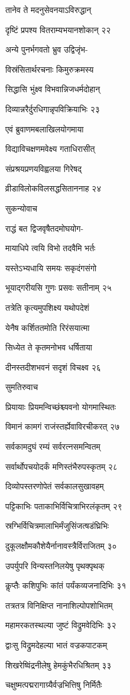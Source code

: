 तानेव ते मदनुसेवनयाऽविरुद्धान्

दृष्टिं प्रपश्य वितराम्यभयानशोकान् २२

अन्ये पुनर्भगवतो भ्रुव उद्विजृंभ-

विस्रंसितार्थरचनाः किमुरुक्रमस्य

सिद्धासि भुंक्ष्व विभवान्निजधर्मदोहान्

दिव्यान्नरैर्दुरधिगान्नृपविक्रियाभिः २३

एवं ब्रुवाणमबलाखिलयोगमाया

विद्याविचक्षणमवेक्ष्य गताधिरासीत्

संप्रश्रयप्रणयविह्वलया गिरेषद्

व्रीडाविलोकविलसद्धसिताननाह २४

सुकन्योवाच

राद्धं बत द्विजवृषैतदमोघयोग-

मायाधिपे त्वयि विभो तदवैमि भर्तः

यस्तेऽभ्यधायि समयः सकृदंगसंगो

भूयाद्गरीयसि गुणः प्रसवः सतीनाम् २५

तत्रेति कृत्यमुपशिक्ष्य यथोपदेशं

येनैष कर्शिततमोति रिरंसयात्मा

सिध्येत ते कृतमनोभव धर्षिताया

दीनस्तदीशभवनं सदृशं विचक्ष्व २६

सुमतिरुवाच

प्रियायाः प्रियमन्विच्छंश्च्यवनो योगमास्थितः

विमानं कामगं राजंस्तर्ह्येवाविरचीकरत् २७

सर्वकामदुघं रम्यं सर्वरत्नसमन्वितम्

सर्वार्थोपचयोदर्कं मणिस्तंभैरुपस्कृतम् २८

दिव्योपस्तरणोपेतं सर्वकालसुखावहम्

पट्टिकाभिः पताकाभिर्विचित्राभिरलंकृतम् २९

स्रग्भिर्विचित्रमालाभिर्मंजुसिंजत्षडंघ्रिभिः

दुकूलक्षौमकौशेयैर्नानावस्त्रैर्विराजितम् ३०

उपर्युपरि विन्यस्तनिलयेषु पृथक्पृथक्

कॢप्तैः कशिपुभिः कांतं पर्यंकव्यजनादिभिः ३१

तत्रतत्र विनिक्षिप्त नानाशिल्पोपशोभितम्

महामरकतस्थल्या जुष्टं विद्रुमवेदिभिः ३२

द्वाःसु विद्रुमदेहल्या भातं वज्रकपाटकम्

शिखरेष्विंद्रनीलेषु हेमकुंभैरधिश्रितम् ३३

चक्षुष्मत्पद्मरागाग्र्यैर्वज्रभित्तिषु निर्मितैः


